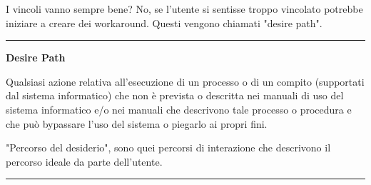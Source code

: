 \documentclass[11pt,a4paper]{book}
\begin{document}
I vincoli vanno sempre bene? No, se l'utente si sentisse troppo vincolato potrebbe iniziare a creare dei workaround. Questi vengono chiamati "desire path".

\noindent\rule{\textwidth}{1pt}
\begin{center}
	\textbf{Desire Path}
\end{center}

Qualsiasi azione relativa all'esecuzione di un processo o di un compito (supportati dal sistema informatico) che non è prevista o descritta nei manuali di uso del sistema informatico e/o nei manuali che descrivono tale processo o procedura e che può bypassare l'uso del sistema o piegarlo ai propri fini.

"Percorso del desiderio", sono quei percorsi di interazione che descrivono il percorso ideale da parte dell'utente.

\noindent\rule{\textwidth}{1pt}
\end{document}
